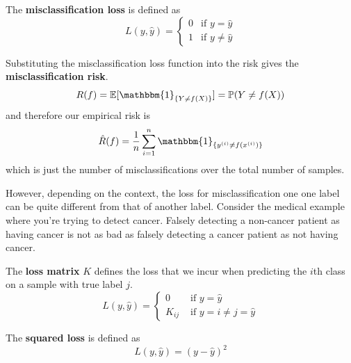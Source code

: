 \documentclass{article}
\begin{document}
  \begin{definition}
    The \textbf{misclassification loss} is defined as 
    \begin{equation}
      L(y, \hat{y}) = \begin{cases} 0 & \text{if } y = \hat{y} \\ 1 & \text{if } y \neq \hat{y} \end{cases}
    \end{equation}
  \end{definition}

  \begin{example}
    Substituting the misclassification loss function into the risk gives the \textbf{misclassification risk}. 
    \begin{equation}
      R(f) = \mathbb{E} [\mathbbm{1}_{\{Y \neq f(X)\}}] = \mathbb{P}(Y \neq f(X)) 
    \end{equation}
    and therefore our empirical risk is 
    \begin{equation}
      \hat{R} (f) = \frac{1}{n} \sum_{i=1}^n \mathbbm{1}_{\{y^{(i)} \neq f(x^{(i)})\}}
    \end{equation}
    which is just the number of misclassifications over the total number of samples. 
  \end{example}

  However, depending on the context, the loss for misclassification one one label can be quite different from that of another label. Consider the medical example where you're trying to detect cancer. Falsely detecting a non-cancer patient as having cancer is not as bad as falsely detecting a cancer patient as not having cancer. 

  \begin{definition}
    The \textbf{loss matrix} $K$ defines the loss that we incur when predicting the $i$th class on a sample with true label $j$. 
    \begin{equation}
      L(y, \hat{y}) = \begin{cases} 0 & \text{ if } y = \hat{y} \\ K_{ij} & \text{ if } y = i \neq j = \hat{y} \end{cases}
    \end{equation}
  \end{definition}

  \begin{definition}
    The \textbf{squared loss} is defined as 
    \begin{equation}
      L(y, \hat{y}) = (y - \hat{y})^2
    \end{equation}
  \end{definition}
\end{document}
